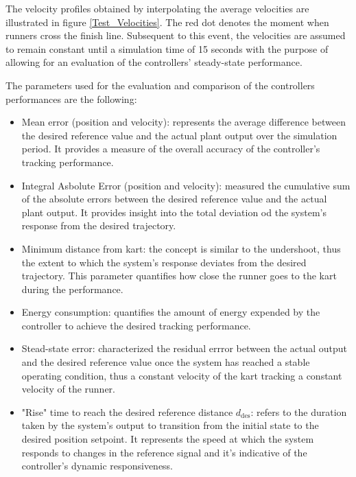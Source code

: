 \documentclass[a4paper,12pt,oneside]{book}
\begin{document}
The velocity profiles obtained by interpolating the average velocities are illustrated in figure \ref{Test_Velocities}.
The red dot denotes the moment when runners cross the finish line.
Subsequent to this event, the velocities are assumed to remain constant until a simulation time of 15 seconds with the purpose of allowing for an evaluation of the controllers' steady-state performance.

The parameters used for the evaluation and comparison of the controllers performances are the following:
\begin{itemize}
	\item Mean error (position and velocity): represents the average difference between the desired reference value and the actual plant output over the simulation period. It provides a measure of the overall accuracy of the controller's tracking performance.
	\item Integral Asbolute Error (position and velocity): measured the cumulative sum of the absolute errors between the desired reference value and the actual plant output. It provides insight into the total deviation od the system's response from the desired trajectory.
	\item Minimum distance from kart: the concept is similar to the undershoot, thus the extent to which the system's response deviates from the desired trajectory. This parameter quantifies how close the runner goes to the kart during the performance.
	\item Energy consumption: quantifies the amount of energy expended by the controller to achieve the desired tracking performance.
	\item Stead-state error: characterized the residual errror between the actual output and the desired reference value once the system has reached a stable operating condition, thus a constant velocity of the kart tracking a constant velocity of the runner.
	\item "Rise" time to reach the desired reference distance $d_\text{des}$: refers to the duration taken by the system's output to transition from the initial state to the desired position setpoint. It represents the speed at which the system responds to changes in the reference signal and it's indicative of the controller's dynamic responsiveness.
\end{itemize}
\end{document}
